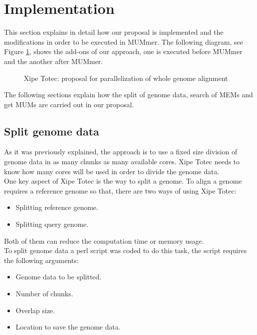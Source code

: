 \documentclass[twocolumn,twoside]{Jornadas}
\begin{document}
\section{Implementation} 
\label{implementation}
This section explains in detail how our proposal is implemented and the modifications in order to be executed in MUMmer. The following diagram, see Figure \ref{xipe-totec}, shows the add-ons of our approach, one is executed before MUMmer and the another after MUMmer.
\begin{figure}[htb]  
 \begin{center} 
 \end{center}
 \caption{Xipe Totec: proposal for parallelization of whole genome alignment} 
 \label{xipe-totec} 
\end{figure}
The following sections explain how the split of genome data, search of MEMs and get MUMs are carried out in our proposal.
\subsection{Split genome data} 
As it was previously explained, the approach is to use a fixed size division of genome data in as many chunks as  many available cores. Xipe Totec needs to know how many cores will be used in order to divide the genome data.\\
One key aspect of Xipe Totec is the way to split a genome. To align a genome requires a reference genome so that, there are two ways of using Xipe Totec:
\begin{itemize}
\item Splitting reference genome.
\item Splitting query genome.
\end{itemize}
Both of them can reduce the computation time or memory usage.\\
To split genome data a perl script was coded to do this task, the script requires the following arguments:
\begin{itemize}
\item Genome data to be splitted.
\item Number of chunks.
\item Overlap size.
\item Location to save the genome data.
\end{itemize}
\end{document}
